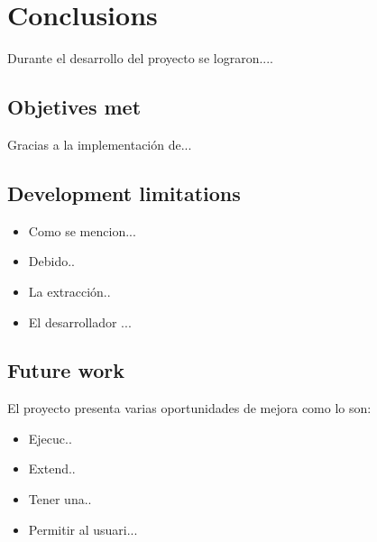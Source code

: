 %
\chapter{Conclusions}
\label{chapter5}

Durante el desarrollo del proyecto se lograron.... 

\section{Objetives met}

Gracias a la implementación de...


\section{Development limitations}
\begin{itemize}
	\item Como se mencion...
	
	\item Debido..
	
	\item La extracción..
	
	\item El desarrollador ...
	
	
\end{itemize}


\section{Future work}

El proyecto presenta varias oportunidades de mejora como lo son:

\begin{itemize}
	\item Ejecuc..
	\item Extend..
	\item Tener una..
	\item Permitir al usuari...
	
	
\end{itemize}


